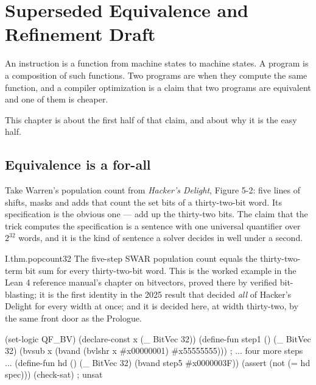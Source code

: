 \chapter{Superseded Equivalence and Refinement Draft}
\label{ch:functions}

An instruction is a function from machine states to machine states. A program is a composition of such functions. Two programs are  when they compute the same function, and a compiler optimization is a claim that two programs are equivalent and one of them is cheaper.

This chapter is about the first half of that claim, and about why it is the easy half.

\section{Equivalence is a for-all}
\label{sec:equiv}

Take Warren's population count from \emph{Hacker's Delight}, Figure 5-2: five lines of shifts, masks and adds that count the set bits of a thirty-two-bit word. Its specification is the obvious one --- add up the thirty-two bits. The claim that the trick computes the specification is a sentence with one universal quantifier over \(2^{32}\) words, and it is the kind of sentence a solver decides in well under a second.

\begin{artifact}{I.thm.popcount32}
The five-step SWAR population count equals the thirty-two-term bit sum for every thirty-two-bit word. This is the worked example in the Lean 4 reference manual's chapter on bitvectors, proved there by verified bit-blasting; it is the first identity in the 2025 result that decided \emph{all} of Hacker's Delight for every width at once; and it is decided here, at width thirty-two, by the same front door as the Prologue.
\end{artifact}

\begin{codelisting}[language=Lisp,caption={The negated equivalence, as the solver sees it. The specification is the thirty-two-term sum; the theorem is that the difference has no model.}]
(set-logic QF_BV)
(declare-const x (_ BitVec 32))
(define-fun step1 () (_ BitVec 32)
  (bvsub x (bvand (bvlshr x #x00000001) #x55555555)))
; ... four more steps ...
(define-fun hd () (_ BitVec 32) (bvand step5 #x0000003F))
(assert (not (= hd spec)))
(check-sat)          ; unsat
\end{codelisting}

